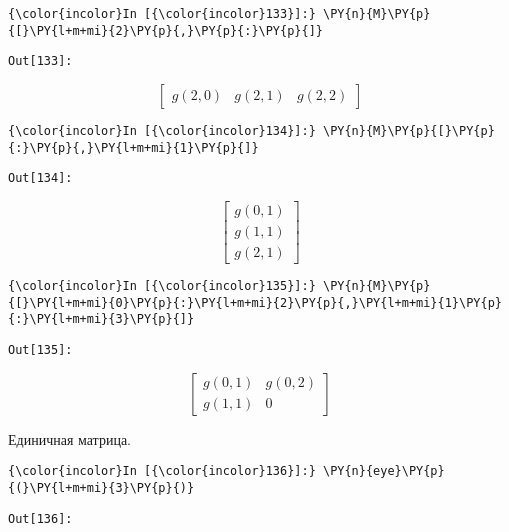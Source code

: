     

    \begin{Verbatim}[commandchars=\\\{\}]
{\color{incolor}In [{\color{incolor}133}]:} \PY{n}{M}\PY{p}{[}\PY{l+m+mi}{2}\PY{p}{,}\PY{p}{:}\PY{p}{]}
\end{Verbatim}
\texttt{\color{outcolor}Out[{\color{outcolor}133}]:}
    
    \[\left[\begin{matrix}g{\left (2,0 \right )} & g{\left (2,1 \right )} & g{\left (2,2 \right )}\end{matrix}\right]\]

    

    \begin{Verbatim}[commandchars=\\\{\}]
{\color{incolor}In [{\color{incolor}134}]:} \PY{n}{M}\PY{p}{[}\PY{p}{:}\PY{p}{,}\PY{l+m+mi}{1}\PY{p}{]}
\end{Verbatim}
\texttt{\color{outcolor}Out[{\color{outcolor}134}]:}
    
    \[\left[\begin{matrix}g{\left (0,1 \right )}\\g{\left (1,1 \right )}\\g{\left (2,1 \right )}\end{matrix}\right]\]

    

    \begin{Verbatim}[commandchars=\\\{\}]
{\color{incolor}In [{\color{incolor}135}]:} \PY{n}{M}\PY{p}{[}\PY{l+m+mi}{0}\PY{p}{:}\PY{l+m+mi}{2}\PY{p}{,}\PY{l+m+mi}{1}\PY{p}{:}\PY{l+m+mi}{3}\PY{p}{]}
\end{Verbatim}
\texttt{\color{outcolor}Out[{\color{outcolor}135}]:}
    
    \[\left[\begin{matrix}g{\left (0,1 \right )} & g{\left (0,2 \right )}\\g{\left (1,1 \right )} & 0\end{matrix}\right]\]

    

    Единичная матрица.

    \begin{Verbatim}[commandchars=\\\{\}]
{\color{incolor}In [{\color{incolor}136}]:} \PY{n}{eye}\PY{p}{(}\PY{l+m+mi}{3}\PY{p}{)}
\end{Verbatim}
\texttt{\color{outcolor}Out[{\color{outcolor}136}]:}
    
